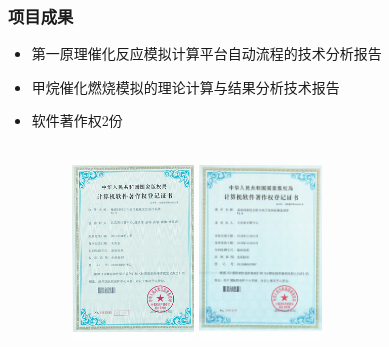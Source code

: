 \documentclass[cjk,slidestop,compress,mathserif,blue]{beamer}
\begin{document}
\frame
{
	\frametitle{项目成果}
	\begin{itemize}
		\item 第一原理催化反应模拟计算平台自动流程的技术分析报告
		\item 甲烷催化燃烧模拟的理论计算与结果分析技术报告
		\item 软件著作权2份\\
			\vskip 3pt
			\fontsize{7.5pt}{4.2pt}\\
			\vskip 5pt
			\fontsize{7.5pt}{4.2pt}
\begin{figure}[h!]
\centering
\vskip -5pt
\includegraphics[height=1.82in]{Figures/Certificate-1.png}
\hskip 5pt
\includegraphics[height=1.82in]{Figures/Certificate-2.jpg}
\label{Certificates}
\end{figure}
	\end{itemize}
}
\end{document}
